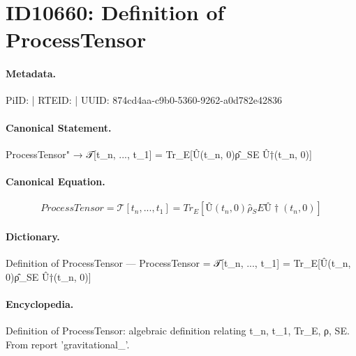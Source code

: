 \section*{ID10660: Definition of ProcessTensor}
\paragraph{Metadata.}
PiID:  | RTEID:  | UUID: 874cd4aa-c9b0-5360-9262-a0d782e42836

\paragraph{Canonical Statement.}
ProcessTensor" → 𝒯[t\_n, ..., t\_1] = Tr\_E[Û(t\_n, 0)ρ̂\_SE Û†(t\_n, 0)]

\paragraph{Canonical Equation.}
\[
ProcessTensor = 𝒯[t_n, ..., t_1] = Tr_E[Û(t_n, 0)ρ̂_SE Û†(t_n, 0)]
\]

\paragraph{Dictionary.}
Definition of ProcessTensor — ProcessTensor = 𝒯[t\_n, ..., t\_1] = Tr\_E[Û(t\_n, 0)ρ̂\_SE Û†(t\_n, 0)]

\paragraph{Encyclopedia.}
Definition of ProcessTensor: algebraic definition relating t\_n, t\_1, Tr\_E, ρ, SE. From report 'gravitational\_'.
